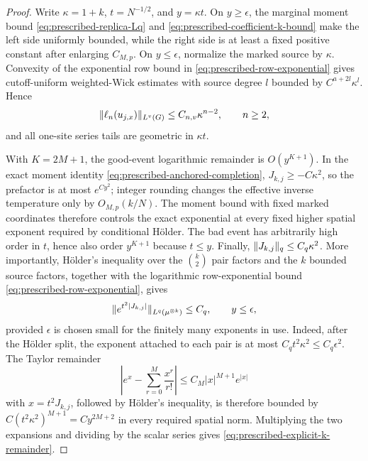 \documentclass[11pt,reqno]{amsart}
\numberwithin{equation}{section}
\theoremstyle{plain}
\theoremstyle{definition}
\DeclarePairedDelimiter{\norm}{\lVert}{\rVert}
\begin{document}
\begin{proof}
Write $\kappa=1+k$, $t=N^{-1/2}$, and $y=\kappa t$.  On $y\geq\epsilon$, the marginal moment bound \eqref{eq:prescribed-replica-Lq} and \eqref{eq:prescribed-coefficient-k-bound} make the left side uniformly bounded, while the right side is at least a fixed positive constant after enlarging $C_{M,p}$.  On $y\leq\epsilon$, normalize the marked source by $\kappa$.  Convexity of the exponential row bound in \eqref{eq:prescribed-row-exponential} gives cutoff-uniform weighted-Wick estimates with source degree $l$ bounded by $C^{a+2l}\kappa^l$.  Hence
\begin{equation}
 \norm{\ell_n(u_{j,x})}_{L^v(G)}\leq C_{n,v}\kappa^{n-2},
 \qquad n\geq2,
 \label{eq:prescribed-k-log-coefficients}
\end{equation}
and all one-site series tails are geometric in $\kappa t$.

With $K=2M+1$, the good-event logarithmic remainder is $O(y^{K+1})$.  In the exact moment identity \eqref{eq:prescribed-anchored-completion}, $J_{k,j}\geq-C\kappa^2$, so the prefactor is at most $e^{Cy^2}$; integer rounding changes the effective inverse temperature only by $O_{M,p}(k/N)$.  The moment bound with fixed marked coordinates therefore controls the exact exponential at every fixed higher spatial exponent required by conditional H\"older.  The bad event has arbitrarily high order in $t$, hence also order $y^{K+1}$ because $t\leq y$.  Finally, $\norm{J_{k,j}}_q\leq C_q\kappa^2$.  More importantly, H\"older's inequality over the $\binom{k}{2}$ pair factors and the $k$ bounded source factors, together with the logarithmic row-exponential bound \eqref{eq:prescribed-row-exponential}, gives
\begin{equation}
 \norm{e^{t^2|J_{k,j}|}}_{L^q(\mu^{\otimes k})}\leq C_q,
 \qquad y\leq\epsilon,
 \label{eq:prescribed-external-factor-exponential-moment}
\end{equation}
provided $\epsilon$ is chosen small for the finitely many exponents in use.  Indeed, after the H\"older split, the exponent attached to each pair is at most $C_qt^2\kappa^2\leq C_q\epsilon^2$.  The Taylor remainder
\begin{equation}
 \left|e^x-\sum_{r=0}^M\frac{x^r}{r!}\right|
 \leq C_M|x|^{M+1}e^{|x|}
 \label{eq:prescribed-external-factor-Taylor-remainder}
\end{equation}
with $x=t^2J_{k,j}$, followed by H\"older's inequality, is therefore bounded by $C(t^2\kappa^2)^{M+1}=Cy^{2M+2}$ in every required spatial norm.  Multiplying the two expansions and dividing by the scalar series gives \eqref{eq:prescribed-explicit-k-remainder}.
\end{proof}
\end{document}
